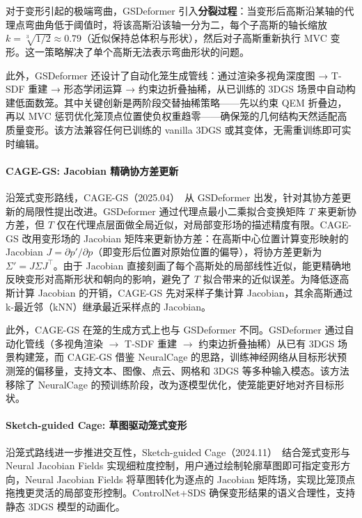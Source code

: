 对于变形引起的极端弯曲，GSDeformer 引入\textbf{分裂过程}：当变形后高斯沿某轴的代理点弯曲角低于阈值时，将该高斯沿该轴一分为二，每个子高斯的轴长缩放 $k = \sqrt[3]{1/2} \approx 0.79$（近似保持总体积与形状），然后对子高斯重新执行 MVC 变形。这一策略解决了单个高斯无法表示弯曲形状的问题。

此外，GSDeformer 还设计了自动化笼生成管线：通过渲染多视角深度图 → T-SDF 重建 → 形态学闭运算 → 约束边折叠抽稀，从已训练的 3DGS 场景中自动构建低面数笼。其中关键创新是两阶段交替抽稀策略——先以约束 QEM 折叠边，再以 MVC 惩罚优化笼顶点位置使负权重趋零——确保笼的几何结构天然适配高质量变形。该方法兼容任何已训练的 vanilla 3DGS 或其变体，无需重训练即可实时编辑。

\paragraph{CAGE-GS: Jacobian 精确协方差更新}

沿笼式变形路线，CAGE-GS（2025.04）~\cite{2504_12800}从 GSDeformer 出发，针对其协方差更新的局限性提出改进。GSDeformer 通过代理点最小二乘拟合变换矩阵 $T$ 来更新协方差，但 $T$ 仅在代理点层面做全局近似，对局部变形场的描述精度有限。CAGE-GS 改用变形场的 Jacobian 矩阵来更新协方差：在高斯中心位置计算变形映射的 Jacobian $J = \partial p' / \partial p$（即变形后位置对原始位置的偏导），将协方差更新为 $\Sigma' = J \Sigma J^\top$。由于 Jacobian 直接刻画了每个高斯处的局部线性近似，能更精确地反映变形对高斯形状和朝向的影响，避免了 $T$ 拟合带来的近似误差。为降低逐高斯计算 Jacobian 的开销，CAGE-GS 先对采样子集计算 Jacobian，其余高斯通过 k-最近邻（kNN）继承最近采样点的 Jacobian。

此外，CAGE-GS 在笼的生成方式上也与 GSDeformer 不同。GSDeformer 通过自动化管线（多视角渲染 $\to$ T-SDF 重建 $\to$ 约束边折叠抽稀）从已有 3DGS 场景构建笼，而 CAGE-GS 借鉴 NeuralCage 的思路，训练神经网络从目标形状预测笼的偏移量，支持文本、图像、点云、网格和 3DGS 等多种输入模态。该方法移除了 NeuralCage 的预训练阶段，改为逐模型优化，使笼能更好地对齐目标形状。

\paragraph{Sketch-guided Cage: 草图驱动笼式变形}

沿笼式路线进一步推进交互性，Sketch-guided Cage（2024.11）~\cite{2411_12168}结合笼式变形与 Neural Jacobian Fields 实现细粒度控制，用户通过绘制轮廓草图即可指定变形方向，Neural Jacobian Fields 将草图转化为逐点的 Jacobian 矩阵场，实现比笼顶点拖拽更灵活的局部变形控制。ControlNet+SDS 确保变形结果的语义合理性，支持静态 3DGS 模型的动画化。

